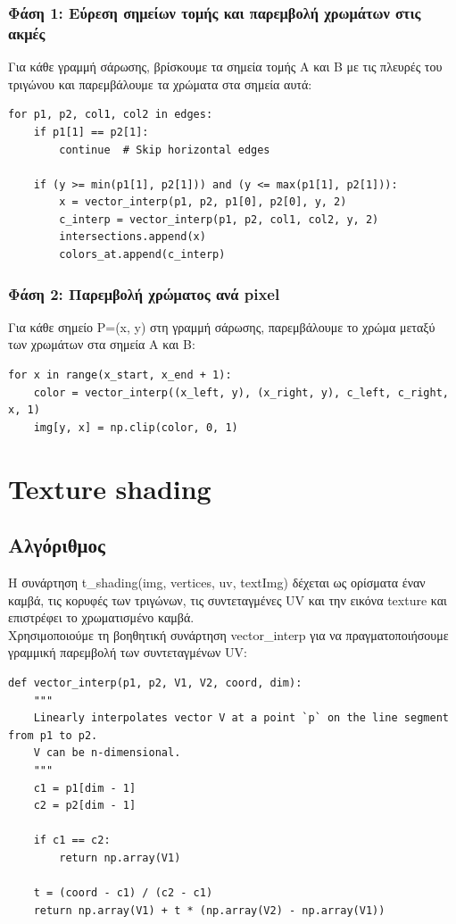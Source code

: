 \documentclass{article}
\begin{document}
\subsubsection{Φάση 1: Εύρεση σημείων τομής και παρεμβολή χρωμάτων στις ακμές}
Για κάθε γραμμή σάρωσης, βρίσκουμε τα σημεία τομής A και B με τις πλευρές του τριγώνου και παρεμβάλουμε τα χρώματα στα σημεία αυτά:

\begin{lstlisting}
for p1, p2, col1, col2 in edges:
    if p1[1] == p2[1]:
        continue  # Skip horizontal edges

    if (y >= min(p1[1], p2[1])) and (y <= max(p1[1], p2[1])):
        x = vector_interp(p1, p2, p1[0], p2[0], y, 2)
        c_interp = vector_interp(p1, p2, col1, col2, y, 2)
        intersections.append(x)
        colors_at.append(c_interp)
\end{lstlisting}

\subsubsection{Φάση 2: Παρεμβολή χρώματος ανά pixel}
Για κάθε σημείο P=(x, y) στη γραμμή σάρωσης, παρεμβάλουμε το χρώμα μεταξύ των χρωμάτων στα σημεία A και B:

\begin{lstlisting}
for x in range(x_start, x_end + 1):
    color = vector_interp((x_left, y), (x_right, y), c_left, c_right, x, 1)
    img[y, x] = np.clip(color, 0, 1)
\end{lstlisting}

\section{Texture shading}

\subsection{Αλγόριθμος}
Η συνάρτηση t\_shading(img, vertices, uv, textImg) δέχεται ως ορίσματα έναν καμβά, τις κορυφές των τριγώνων, τις συντεταγμένες UV και την εικόνα texture και επιστρέφει το χρωματισμένο καμβά.\\
Χρησιμοποιούμε τη βοηθητική συνάρτηση vector\_interp για να πραγματοποιήσουμε γραμμική παρεμβολή των συντεταγμένων UV:

\begin{lstlisting}
def vector_interp(p1, p2, V1, V2, coord, dim):
    """
    Linearly interpolates vector V at a point `p` on the line segment from p1 to p2.
    V can be n-dimensional.
    """
    c1 = p1[dim - 1]
    c2 = p2[dim - 1]

    if c1 == c2:
        return np.array(V1)

    t = (coord - c1) / (c2 - c1)
    return np.array(V1) + t * (np.array(V2) - np.array(V1))
\end{lstlisting}
\end{document}
